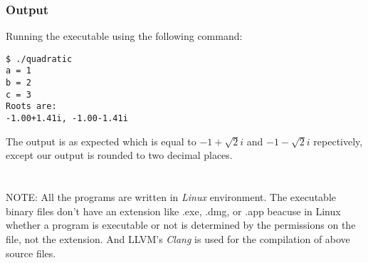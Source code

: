 \documentclass[12pt, letterpaper]{report}
\begin{document}
\subsubsection*{Output}
Running the executable using the following command:
\begin{verbatim}
$ ./quadratic
a = 1
b = 2
c = 3
Roots are: 
-1.00+1.41i, -1.00-1.41i
\end{verbatim}
The output is as expected which is equal to $-1+\sqrt{2}i$ and $-1-\sqrt{2}i$ repectively, except our output is rounded to
two decimal places.

\section*{}
NOTE: All the programs are written in \emph{Linux} environment. The executable binary files don't have an extension like .exe, .dmg, or .app beacuse in Linux whether a program is executable or not is determined by the permissions on the file, not the extension. And LLVM's \emph{Clang} is used for the compilation of above source files.
\end{document}
